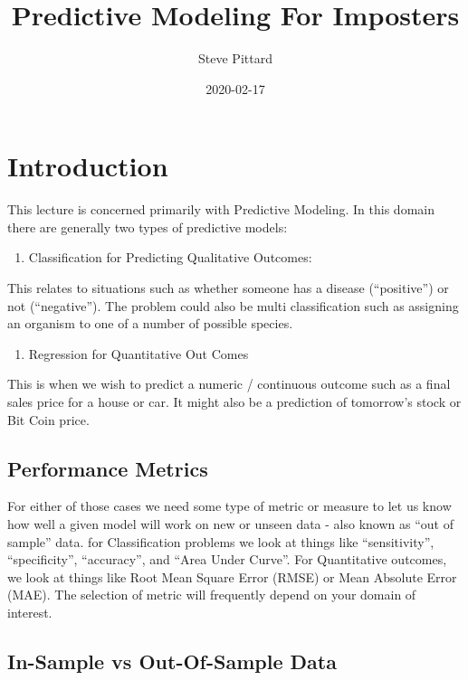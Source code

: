 \documentclass[]{book}
\title{Predictive Modeling For Imposters}
\author{Steve Pittard}
\date{2020-02-17}
\providecommand{\tightlist}{%
  \setlength{\itemsep}{0pt}\setlength{\parskip}{0pt}}
\begin{document}
\maketitle

{
\setcounter{tocdepth}{1}
\tableofcontents
}
\chapter{Introduction}\label{intro}

This lecture is concerned primarily with Predictive Modeling. In this
domain there are generally two types of predictive models:

\begin{enumerate}
\def\labelenumi{\arabic{enumi})}
\tightlist
\item
  Classification for Predicting Qualitative Outcomes:
\end{enumerate}

This relates to situations such as whether someone has a disease
(``positive'') or not (``negative''). The problem could also be multi
classification such as assigning an organism to one of a number of
possible species.

\begin{enumerate}
\def\labelenumi{\arabic{enumi})}
\setcounter{enumi}{1}
\tightlist
\item
  Regression for Quantitative Out Comes
\end{enumerate}

This is when we wish to predict a numeric / continuous outcome such as a
final sales price for a house or car. It might also be a prediction of
tomorrow's stock or Bit Coin price.

\section{Performance Metrics}\label{performance-metrics}

For either of those cases we need some type of metric or measure to let
us know how well a given model will work on new or unseen data - also
known as ``out of sample'' data. for Classification problems we look at
things like ``sensitivity'', ``specificity'', ``accuracy'', and ``Area
Under Curve''. For Quantitative outcomes, we look at things like Root
Mean Square Error (RMSE) or Mean Absolute Error (MAE). The selection of
metric will frequently depend on your domain of interest.

\section{In-Sample vs Out-Of-Sample
Data}\label{in-sample-vs-out-of-sample-data}
\end{document}
